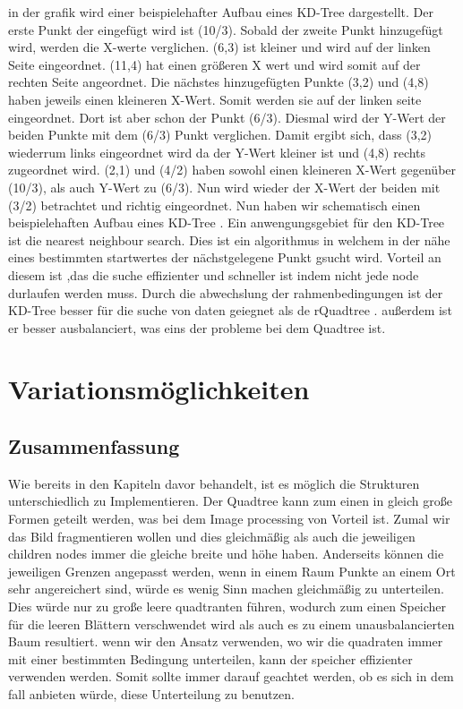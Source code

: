 \documentclass[11pt]{article}
\newcommand{\qt}{Quadtree }
\newcommand{\kd}{KD-Tree }
\begin{document}
in der grafik wird einer beispielehafter Aufbau eines \kd dargestellt. Der erste Punkt der eingefügt wird ist (10/3). Sobald der zweite Punkt hinzugefügt wird, werden die X-werte verglichen. (6,3) ist kleiner und wird auf der linken Seite eingeordnet.
(11,4) hat einen größeren X wert und wird somit auf der rechten Seite angeordnet. Die nächstes hinzugefügten Punkte (3,2) und (4,8) haben jeweils einen kleineren X-Wert. Somit werden sie auf der linken seite eingeordnet. Dort ist aber schon der Punkt (6/3).
Diesmal wird der Y-Wert der beiden Punkte mit dem (6/3) Punkt verglichen. Damit ergibt sich, dass (3,2) wiederrum links eingeordnet wird da der Y-Wert kleiner ist und (4,8) rechts zugeordnet wird. 
(2,1) und (4/2) haben sowohl einen kleineren X-Wert gegenüber (10/3), als auch Y-Wert zu (6/3). Nun wird wieder der X-Wert der beiden mit (3/2) betrachtet und richtig eingeordnet. Nun haben wir schematisch einen beispielehaften Aufbau eines \kd. 
\newline
Ein anwengungsgebiet für den \kd ist die nearest neighbour search.  Dies ist ein algorithmus in welchem in der nähe eines bestimmten startwertes der nächstgelegene Punkt gsucht wird. Vorteil an diesem ist ,das die suche effizienter und schneller ist indem nicht jede node durlaufen werden muss. 
Durch die abwechslung der rahmenbedingungen ist der \kd besser für die suche von daten geiegnet als de r\qt. außerdem ist er besser ausbalanciert, was eins der probleme bei dem \qt ist. 

\pagebreak

\section{Variationsmöglichkeiten} \label{Varianten}

\subsection{Zusammenfassung}
Wie bereits in den Kapiteln davor behandelt, ist es möglich die Strukturen unterschiedlich zu Implementieren. 
Der \qt kann zum einen in gleich große Formen geteilt werden, was bei dem Image processing von Vorteil ist. Zumal wir das Bild fragmentieren wollen und dies gleichmäßig als auch die jeweiligen children nodes immer die gleiche breite und höhe haben. Anderseits können die jeweiligen Grenzen angepasst werden, wenn in einem Raum Punkte an einem Ort sehr angereichert sind, würde es wenig Sinn machen gleichmäßig zu unterteilen. 
Dies würde nur zu große leere quadtranten führen, wodurch zum einen Speicher für die leeren Blättern verschwendet wird als auch es zu einem unausbalancierten Baum resultiert. 
\newline
wenn wir den Ansatz verwenden, wo wir die quadraten immer mit einer bestimmten Bedingung unterteilen, kann der speicher effizienter verwenden werden.  Somit sollte immer darauf geachtet werden, ob es sich in dem fall anbieten würde, diese Unterteilung zu benutzen.
\end{document}
